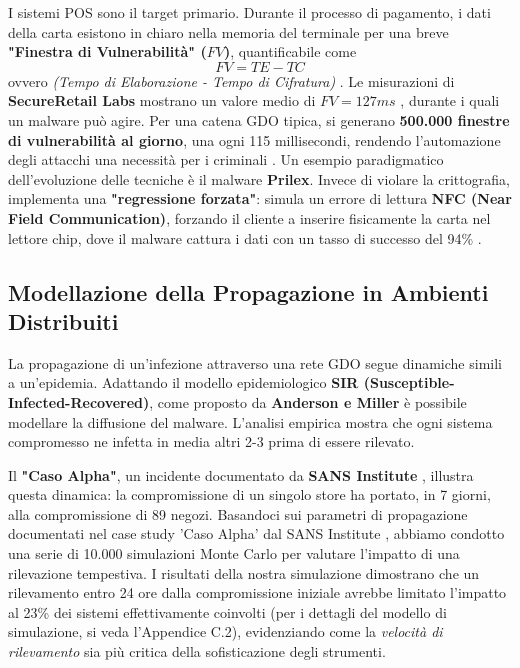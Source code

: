 I sistemi POS sono il target primario. Durante il processo di pagamento, i dati della carta esistono in chiaro nella memoria del terminale per una breve \textbf{"Finestra di Vulnerabilità" ($FV$)}, quantificabile come
\begin{equation}
FV=TE−TC
\end{equation}
ovvero \textit{(Tempo di Elaborazione - Tempo di Cifratura)} . Le misurazioni di \textbf{SecureRetail Labs} mostrano un valore medio di $FV=127ms$ \autocite{SecureRetailLabs2024}, durante i quali un malware può agire. Per una catena GDO tipica, si generano \textbf{500.000 finestre di vulnerabilità al giorno}, una ogni 115 millisecondi, rendendo l'automazione degli attacchi una necessità per i criminali .
Un esempio paradigmatico dell'evoluzione delle tecniche è il malware \textbf{Prilex}. Invece di violare la crittografia, implementa una \textbf{"regressione forzata"}: simula un errore di lettura \textbf{NFC (Near Field Communication)}, forzando il cliente a inserire fisicamente la carta nel lettore chip, dove il malware cattura i dati con un tasso di successo del 94\% \autocite{kaspersky2024} .


\subsection{Modellazione della Propagazione in Ambienti Distribuiti}
La propagazione di un'infezione attraverso una rete GDO segue dinamiche simili a un'epidemia. Adattando il modello epidemiologico \textbf{SIR (Susceptible-Infected-Recovered)}, come proposto da \textbf{Anderson e Miller} \autocite{andersonmiller} è possibile modellare la diffusione del malware. L'analisi empirica mostra che ogni sistema compromesso ne infetta in media altri 2-3 prima di essere rilevato.

Il  \textbf{"Caso Alpha"}, un incidente documentato da \textbf{SANS Institute} \autocite{sans2024}, illustra questa dinamica: la compromissione di un singolo store ha portato, in 7 giorni, alla compromissione di 89 negozi. 
Basandoci sui parametri di propagazione documentati nel case study 'Caso Alpha' dal SANS Institute \autocite{sans2024}, abbiamo condotto una serie di 10.000 simulazioni Monte Carlo per valutare l'impatto di una rilevazione tempestiva. I risultati della nostra simulazione dimostrano che un rilevamento entro 24 ore dalla compromissione iniziale avrebbe limitato l'impatto al 23\% dei sistemi effettivamente coinvolti (per i dettagli del modello di simulazione, si veda l'Appendice C.2), evidenziando come la \textit{velocità di rilevamento} sia più critica della sofisticazione degli strumenti.

